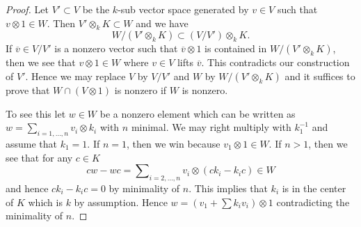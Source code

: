 \documentclass[10pt,a4paper]{amsart}
\theoremstyle{plain}
\theoremstyle{definition}
\theoremstyle{remark}
\numberwithin{equation}{subsection}
\begin{document}
\begin{proof}
Let $V' \subset V$ be the $k$-sub vector space generated by $v \in V$
such that $v \otimes 1 \in W$. Then $V' \otimes_k K \subset W$ and
we have
$$
W/(V' \otimes_k K)  \subset  (V/V') \otimes_k K.
$$
If $\overline{v} \in V/V'$ is a nonzero vector such that
$\overline{v} \otimes 1$ is contained in $W/(V' \otimes_k K)$,
then we see that $v \otimes 1 \in W$ where $v \in V$ lifts $\overline{v}$.
This contradicts our construction of $V'$. Hence we may replace
$V$ by $V/V'$ and $W$ by $W/(V' \otimes_k K)$ and it suffices to prove
that $W \cap (V \otimes 1)$ is nonzero if $W$ is nonzero.

\medskip\noindent
To see this let $w \in W$ be a nonzero element which can be written
as $w = \sum_{i = 1, \ldots, n} v_i \otimes k_i$ with $n$ minimal.
We may right multiply with $k_1^{-1}$ and assume that $k_1 = 1$.
If $n = 1$, then we win because $v_1 \otimes 1 \in W$.
If $n > 1$, then we see that for any $c \in K$
$$
c w - w c = \sum\nolimits_{i = 2, \ldots, n} v_i \otimes (c k_i - k_i c) \in W
$$
and hence $c k_i - k_i c = 0$ by minimality of $n$.
This implies that $k_i$ is in the center of $K$ which is $k$ by
assumption. Hence $w = (v_1 + \sum k_i v_i) \otimes 1$ contradicting
the minimality of $n$.
\end{proof}
\end{document}
